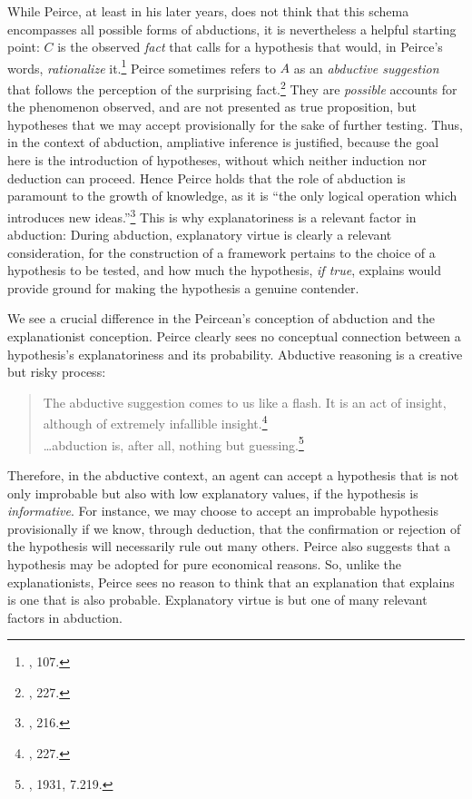 While Peirce, at least in his later years, does not think that this schema encompasses all possible forms of abductions, it is nevertheless a helpful starting point: \(C\) is the observed \emph{fact} that calls for a
hypothesis that would, in Peirce's words, \emph{rationalize}
it.\footnote{\cite{essentialpeirce2}, 107.}
Peirce sometimes refers to \(A\) as an \emph{abductive suggestion} that
follows the perception of the surprising fact.\footnote{\cite{essentialpeirce2}, 227.}
They are \emph{possible} accounts for the phenomenon observed, and are
not presented as true proposition, but hypotheses that we may accept
provisionally for the sake of further testing. Thus, in the context of
abduction, ampliative inference is justified, because the goal here is
the introduction of hypotheses, without which neither induction nor
deduction can proceed. Hence Peirce holds that the role of abduction is
paramount to the growth of knowledge, as it is ``the only logical
operation which introduces new ideas.''\footnote{\cite{essentialpeirce2}, 216.} This is
why explanatoriness is a relevant factor in abduction: During abduction,
explanatory virtue is clearly a relevant consideration, for the
construction of a framework pertains to the choice of a hypothesis to be
tested, and how much the hypothesis, \emph{if true}, explains would
provide ground for making the hypothesis a genuine contender.

We see a crucial difference in the Peircean's conception of abduction
and the explanationist conception. Peirce clearly sees no conceptual
connection between a hypothesis's explanatoriness and its probability.
Abductive reasoning is a creative but risky process:

\begin{quote}
The abductive suggestion comes to us like a flash. It is an act of
insight, although of extremely infallible insight.\footnote{\cite{essentialpeirce2}, 227.}\\

\ldots{}abduction is, after all, nothing but guessing.\footnote{\cite{CP}, 1931, 7.219.}
\end{quote}
Therefore, in the abductive context, an agent can accept a hypothesis
that is not only improbable but also with low explanatory values, if the
hypothesis is \emph{informative}. For instance, we may choose to accept
an improbable hypothesis provisionally if we know, through deduction,
that the confirmation or rejection of the hypothesis will necessarily
rule out many others. Peirce also suggests that a hypothesis may be
adopted for pure economical reasons. So, unlike the explanationists,
Peirce sees no reason to think that an explanation that explains is one
that is also probable. Explanatory virtue is but one of many relevant
factors in abduction.

